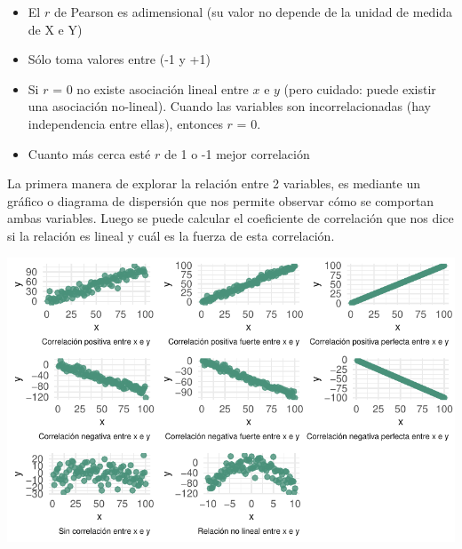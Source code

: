 \documentclass[
  letterpaper,
  DIV=11,
  numbers=noendperiod]{scrartcl}
\begin{document}
\begin{tcolorbox}[enhanced jigsaw, toptitle=1mm, colbacktitle=quarto-callout-important-color!10!white, opacitybacktitle=0.6, leftrule=.75mm, rightrule=.15mm, title=\textcolor{quarto-callout-important-color}{\faExclamation}\hspace{0.5em}{En resumen}, colframe=quarto-callout-important-color-frame, breakable, coltitle=black, bottomrule=.15mm, opacityback=0, left=2mm, titlerule=0mm, bottomtitle=1mm, toprule=.15mm, colback=white, arc=.35mm]

\begin{itemize}
\item
  El \(r\) de Pearson es adimensional (su valor no depende de la unidad
  de medida de X e Y)
\item
  Sólo toma valores entre (-1 y +1)
\item
  Si \(r\) = 0 no existe asociación lineal entre \(x\) e \(y\) (pero
  cuidado: puede existir una asociación no-lineal). Cuando las variables
  son incorrelacionadas (hay independencia entre ellas), entonces \(r\)
  = 0.
\item
  Cuanto más cerca esté \(r\) de 1 o -1 mejor correlación
\end{itemize}

\end{tcolorbox}

La primera manera de explorar la relación entre 2 variables, es mediante
un gráfico o diagrama de dispersión que nos permite observar cómo se
comportan ambas variables. Luego se puede calcular el coeficiente de
correlación que nos dice si la relación es lineal y cuál es la fuerza de
esta correlación.

\begin{center}
\includegraphics{index_files/figure-pdf/unnamed-chunk-3-1.pdf}
\end{center}
\end{document}
